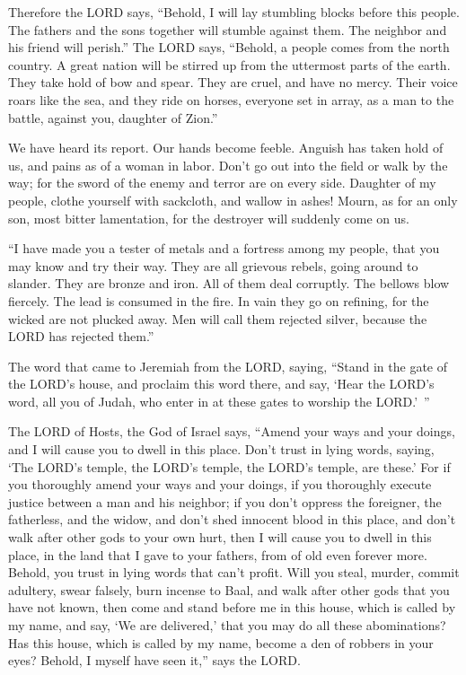 \myverse{}Therefore the LORD says, “Behold, I will lay stumbling blocks before this people. The fathers and the sons together will stumble against them. The neighbor and his friend will perish.” \myverse{}The LORD says, “Behold, a people comes from the north country. A great nation will be stirred up from the uttermost parts of the earth. \myverse{}They take hold of bow and spear. They are cruel, and have no mercy. Their voice roars like the sea, and they ride on horses, everyone set in array, as a man to the battle, against you, daughter of Zion.”


\myverse{}We have heard its report. Our hands become feeble. Anguish has taken hold of us, and pains as of a woman in labor. \myverse{}Don’t go out into the field or walk by the way; for the sword of the enemy and terror are on every side. \myverse{}Daughter of my people, clothe yourself with sackcloth, and wallow in ashes! Mourn, as for an only son, most bitter lamentation, for the destroyer will suddenly come on us.


\myverse{}“I have made you a tester of metals and a fortress among my people, that you may know and try their way. \myverse{}They are all grievous rebels, going around to slander. They are bronze and iron. All of them deal corruptly. \myverse{}The bellows blow fiercely. The lead is consumed in the fire. In vain they go on refining, for the wicked are not plucked away. \myverse{}Men will call them rejected silver, because the LORD has rejected them.”


\mychapter{} \myverse*{}The word that came to Jeremiah from the LORD, saying, \myverse{}“Stand in the gate of the LORD’s house, and proclaim this word there, and say, ‘Hear the LORD’s word, all you of Judah, who enter in at these gates to worship the LORD.’ ”


\myverse{}The LORD of Hosts, the God of Israel says, “Amend your ways and your doings, and I will cause you to dwell in this place. \myverse{}Don’t trust in lying words, saying, ‘The LORD’s temple, the LORD’s temple, the LORD’s temple, are these.’ \myverse{}For if you thoroughly amend your ways and your doings, if you thoroughly execute justice between a man and his neighbor; \myverse{}if you don’t oppress the foreigner, the fatherless, and the widow, and don’t shed innocent blood in this place, and don’t walk after other gods to your own hurt, \myverse{}then I will cause you to dwell in this place, in the land that I gave to your fathers, from of old even forever more. \myverse{}Behold, you trust in lying words that can’t profit. \myverse{}Will you steal, murder, commit adultery, swear falsely, burn incense to Baal, and walk after other gods that you have not known, \myverse{}then come and stand before me in this house, which is called by my name, and say, ‘We are delivered,’ that you may do all these abominations? \myverse{}Has this house, which is called by my name, become a den of robbers in your eyes? Behold, I myself have seen it,” says the LORD.


